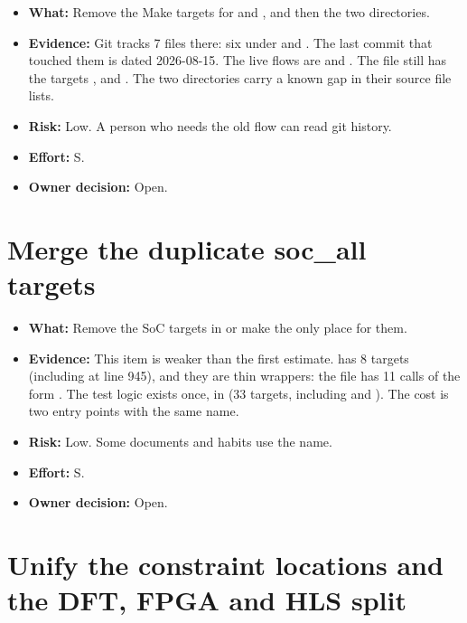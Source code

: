 \begin{itemize}
\item \textbf{What:} Remove the Make targets for  and , and then the two directories.
\item \textbf{Evidence:} Git tracks 7 files there: six under  and . The last commit that touched them is dated 2026-08-15. The live flows are  and . The file  still has the targets ,  and . The two directories carry a known gap in their source file lists.
\item \textbf{Risk:} Low. A person who needs the old flow can read git history.
\item \textbf{Effort:} S.
\item \textbf{Owner decision:} Open.
\end{itemize}

\section{Merge the duplicate soc\_all targets}\label{um:guide:cleanup-recommendations:soc-all-duplicate}

\begin{itemize}
\item \textbf{What:} Remove the SoC targets in  or make  the only place for them.
\item \textbf{Evidence:} This item is weaker than the first estimate.  has 8  targets (including  at line 945), and they are thin wrappers: the file has 11 calls of the form . The test logic exists once, in  (33  targets, including  and ). The cost is two entry points with the same name.
\item \textbf{Risk:} Low. Some documents and habits use the  name.
\item \textbf{Effort:} S.
\item \textbf{Owner decision:} Open.
\end{itemize}

\section{Unify the constraint locations and the DFT, FPGA and HLS split}\label{um:guide:cleanup-recommendations:layout}

